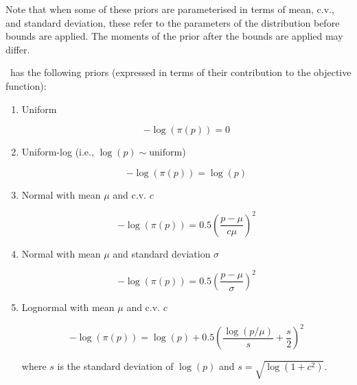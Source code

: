 Note that when some of these priors are parameterised in terms of mean, c.v., and standard deviation, these refer to the parameters of the distribution before bounds are applied. The moments of the prior after the bounds are applied may differ.

\SPM\ has the following priors (expressed in terms of their contribution to the objective function): 

\begin{enumerate}
\item{Uniform}

\begin{equation}
 - \log \left(\pi \left(p \right) \right) = 0
\end{equation}

\item{Uniform-log} (i.e., $\log(p) \sim \text{uniform}$)

\begin{equation}
 - \log \left(\pi \left(p \right) \right) = \log \left( p \right)
\end{equation}

\item{Normal with mean $\mu$ and c.v. $c$}

\begin{equation}
 - \log \left(\pi \left(p \right) \right) = 0.5\left(\frac{p - \mu}{c\mu} \right)^2 
\end{equation}

\item{Normal with mean $\mu$ and standard deviation $\sigma$}

\begin{equation}
 - \log \left(\pi \left(p \right) \right) = 0.5\left(\frac{p - \mu}
{\sigma }\right)^2
\end{equation}

\item{Lognormal with mean $\mu$ and c.v. $c$} 

\begin{equation}
 - \log \left(\pi \left(p \right) \right) = \log \left( p \right) + 0.5 \left( \frac{\log \left( p / \mu \right)}{s} + \frac{s}{2} \right)^2
\end{equation}

where $s$ is the standard deviation of $\log(p)$ and $s= \sqrt{\log \left(1+c^2 \right)}$.


\end{enumerate}
